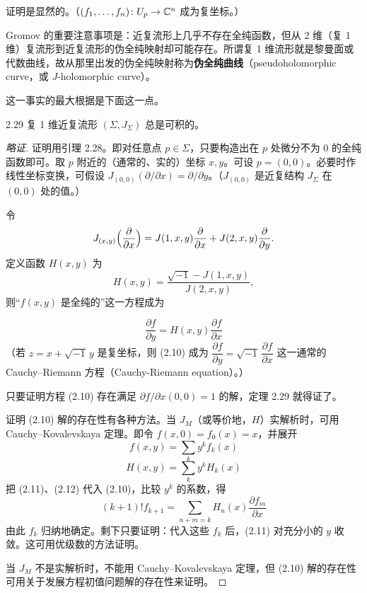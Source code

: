 证明是显然的。（$(f_1,\dots,f_n)\colon U_p\to\mathbb{C}^n$ 成为复坐标。）

Gromov 的重要注意事项是：近复流形上几乎不存在全纯函数，但从 2 维（复 1 维）复流形到近复流形的伪全纯映射却可能存在。所谓复 1 维流形就是黎曼面或代数曲线，故从那里出发的伪全纯映射称为\textbf{伪全纯曲线}（pseudoholomorphic curve，或 $J$-holomorphic curve）。

这一事实的最大根据是下面这一点。

\begin{theorem*}{2.29}
  复 1 维近复流形 $(\Sigma,J_\Sigma)$ 总是可积的。
\end{theorem*}

\begin{proof}[略证]
  证明用引理 2.28。即对任意点 $p\in\Sigma$，只要构造出在 $p$ 处微分不为 0 的全纯函数即可。取 $p$ 附近的（通常的、实的）坐标 $x,y$。可设 $p=(0,0)$。必要时作线性坐标变换，可假设 $J_{(0,0)}(\partial/\partial x)=\partial/\partial y$。（$J_{(0,0)}$ 是近复结构 $J_\Sigma$ 在 $(0,0)$ 处的值。）

  令
  \[
    J_{(x,y)}\Bigl(\frac{\partial}{\partial x}\Bigr)=J(1,x,y)\frac{\partial}{\partial x}+J(2,x,y)\frac{\partial}{\partial y}.
  \]
  定义函数 $H(x,y)$ 为
  \[
    H(x,y)=\frac{\sqrt{-1}-J(1,x,y)}{J(2,x,y)},
  \]
  则“$f(x,y)$ 是全纯的”这一方程成为

  \begin{equation}
    \frac{\partial f}{\partial y}=H(x,y)\frac{\partial f}{\partial x} \tag{2.10}
  \end{equation}
  （若 $z=x+\sqrt{-1}\,y$ 是复坐标，则 (2.10) 成为 $\dfrac{\partial f}{\partial y}=\sqrt{-1}\,\dfrac{\partial f}{\partial x}$ 这一通常的 Cauchy–Riemann 方程（Cauchy-Riemann equation）。）

  只要证明方程 (2.10) 存在满足 $\partial f/\partial x(0,0)=1$ 的解，定理 2.29 就得证了。

  证明 (2.10) 解的存在性有各种方法。当 $J_M$（或等价地，$H$）实解析时，可用 Cauchy–Kovalevskaya 定理。即令 $f(x,0)=f_0(x)=x$，并展开
  \begin{equation}
    f(x,y)=\sum_k y^kf_k(x) \tag{2.11}
  \end{equation}
  \begin{equation}
    H(x,y)=\sum_k y^kH_k(x) \tag{2.12}
  \end{equation}
  把 (2.11)、(2.12) 代入 (2.10)，比较 $y^k$ 的系数，得
  \begin{equation}
    (k+1)!f_{k+1}=\sum_{n+m=k}H_n(x)\frac{\partial f_m}{\partial x} \tag{2.13}
  \end{equation}
  由此 $f_k$ 归纳地确定。剩下只要证明：代入这些 $f_k$ 后，(2.11) 对充分小的 $y$ 收敛。这可用优级数的方法证明。

  当 $J_M$ 不是实解析时，不能用 Cauchy–Kovalevskaya 定理，但 (2.10) 解的存在性可用关于发展方程初值问题解的存在性来证明。
\end{proof}

